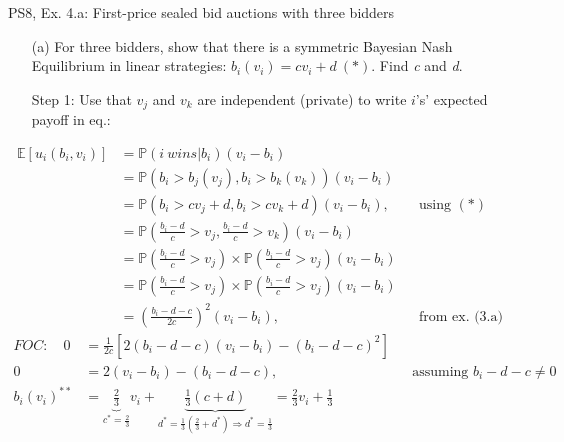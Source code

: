 \begin{frame}{PS8, Ex. 4.a: First-price sealed bid auctions with three bidders}
    \begin{itemize}
      \item[(a)] For three bidders, show that there is a symmetric Bayesian Nash Equilibrium in linear strategies: $b_i(v_i) = cv_i + d\ (*)$. Find \textit{c} and \textit{d}.
      \item[Step 1:] Use that $v_j$ and $v_k$ are independent (private) to write $i$'s' expected payoff in eq.:
    \end{itemize}
    \vspace{-10pt}
    \begin{align*}
      \mathbb{E}[u_i(b_i,v_i)]
      &=\mathbb{P}(i\ wins|b_i)(v_i-b_i)\\
      &=\mathbb{P}\left(b_i>b_j(v_j),b_i>b_k(v_k)\right)(v_i-b_i)\\
      &=\mathbb{P}(b_i>cv_j+d,b_i>cv_k+d)(v_i-b_i),&&\text{using }(*)\\
      &=\mathbb{P}\left(\frac{b_i-d}{c}>v_j,\frac{b_i-d}{c}>v_k\right)(v_i-b_i)\\
      &=\mathbb{P}\left(\frac{b_i-d}{c}>v_j\right)\times\mathbb{P}\left(\frac{b_i-d}{c}>v_j\right)(v_i-b_i)\\
      &=\mathbb{P}\left(\frac{b_i-d}{c}>v_j\right)\times\mathbb{P}\left(\frac{b_i-d}{c}>v_j\right)(v_i-b_i)\\
      &=\left(\frac{b_i-d-c}{2c}\right)^2(v_i-b_i),&&\text{from ex. (3.a)}
    \end{align*}
    \vspace{-8pt}
    \begin{align*}
      FOC:\quad   0&=\frac{1}{2c}[2(b_i-d-c)(v_i-b_i)-(b_i-d-c)^2]\\
                  0&=2(v_i-b_i)-(b_i-d-c),&&\text{assuming }b_i-d-c\neq0\\
      b_i(v_i)^{**}&=\underbrace{\frac{2}{3}}_{c^{*}=\frac{2}{3}}v_i+\underbrace{\frac{1}{3}(c+d)}_{d^{*}=\frac{1}{3}\left(\frac{2}{3}+d^{*}\right)\Rightarrow d^{*}=\frac{1}{3}}=\frac{2}{3}v_i+\frac{1}{3}
    \end{align*}
    \vfill\null
\end{frame}


